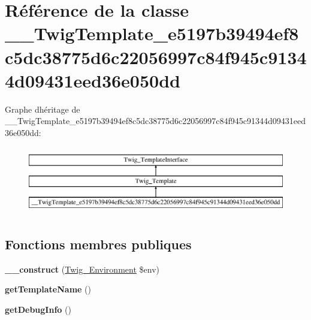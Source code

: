 \hypertarget{class_____twig_template__e5197b39494ef8c5dc38775d6c22056997c84f945c91344d09431eed36e050dd}{}\section{Référence de la classe \+\_\+\+\_\+\+Twig\+Template\+\_\+e5197b39494ef8c5dc38775d6c22056997c84f945c91344d09431eed36e050dd}
\label{class_____twig_template__e5197b39494ef8c5dc38775d6c22056997c84f945c91344d09431eed36e050dd}
Graphe d\textquotesingle{}héritage de \+\_\+\+\_\+\+Twig\+Template\+\_\+e5197b39494ef8c5dc38775d6c22056997c84f945c91344d09431eed36e050dd\+:\begin{figure}[H]
\begin{center}
\leavevmode
\includegraphics[height=3.000000cm]{class_____twig_template__e5197b39494ef8c5dc38775d6c22056997c84f945c91344d09431eed36e050dd}
\end{center}
\end{figure}
\subsection*{Fonctions membres publiques}
\begin{DoxyCompactItemize}
\item 
{\bfseries \+\_\+\+\_\+construct} (\hyperlink{class_twig___environment}{Twig\+\_\+\+Environment} \$env)\hypertarget{class_____twig_template__e5197b39494ef8c5dc38775d6c22056997c84f945c91344d09431eed36e050dd_a4f8326243132c1450a81e0a817aa1be7}{}\label{class_____twig_template__e5197b39494ef8c5dc38775d6c22056997c84f945c91344d09431eed36e050dd_a4f8326243132c1450a81e0a817aa1be7}

\item 
{\bfseries get\+Template\+Name} ()\hypertarget{class_____twig_template__e5197b39494ef8c5dc38775d6c22056997c84f945c91344d09431eed36e050dd_a621a3ccd148ed8b9e937da6959c98f39}{}\label{class_____twig_template__e5197b39494ef8c5dc38775d6c22056997c84f945c91344d09431eed36e050dd_a621a3ccd148ed8b9e937da6959c98f39}

\item 
{\bfseries get\+Debug\+Info} ()\hypertarget{class_____twig_template__e5197b39494ef8c5dc38775d6c22056997c84f945c91344d09431eed36e050dd_abd0ecb0136f4228db2bd963bfc1e20d7}{}\label{class_____twig_template__e5197b39494ef8c5dc38775d6c22056997c84f945c91344d09431eed36e050dd_abd0ecb0136f4228db2bd963bfc1e20d7}

\end{DoxyCompactItemize}
